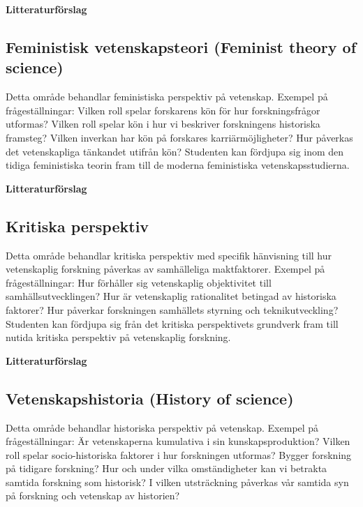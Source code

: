 \documentclass[12pt,a4paper]{article}
\begin{document}
\noindent \textbf{Litteraturförslag}

 \fullcite{}
 
 \fullcite{}
  
 \fullcite{}

\subsection{Feministisk vetenskapsteori (Feminist theory of science)} 
Detta område behandlar feministiska perspektiv på vetenskap. Exempel på frågeställningar: Vilken roll spelar forskarens kön för hur forskningsfrågor utformas? Vilken roll spelar kön i hur vi beskriver forskningens historiska framsteg? Vilken inverkan har kön på forskares karriärmöjligheter? Hur påverkas det vetenskapliga tänkandet utifrån kön? Studenten kan fördjupa sig inom den tidiga feministiska teorin fram till de moderna feministiska vetenskapsstudierna. 


\noindent \textbf{Litteraturförslag}

 \fullcite{}
 
 \fullcite{}
  
 \fullcite{}

\subsection{Kritiska perspektiv}
Detta område behandlar kritiska perspektiv med specifik hänvisning till hur vetenskaplig forskning påverkas av samhälleliga maktfaktorer. Exempel på frågeställningar: Hur förhåller sig vetenskaplig objektivitet till samhällsutvecklingen? Hur är vetenskaplig rationalitet betingad av historiska faktorer? Hur påverkar forskningen samhällets styrning och teknikutveckling? Studenten kan fördjupa sig från det kritiska perspektivets grundverk fram till nutida kritiska perspektiv på vetenskaplig forskning. 


\noindent \textbf{Litteraturförslag}

 \fullcite{}
 
 \fullcite{}
  
 \fullcite{}

\subsection{Vetenskapshistoria (History of science)}
Detta område behandlar historiska perspektiv på vetenskap. Exempel på frågeställningar: Är vetenskaperna kumulativa i sin kunskapsproduktion? Vilken roll spelar socio-historiska faktorer i hur forskningen utformas? Bygger forskning på tidigare forskning? Hur och under vilka omständigheter kan vi betrakta samtida forskning som historisk? I vilken utsträckning påverkas vår samtida syn på forskning och vetenskap av historien? 
\end{document}
